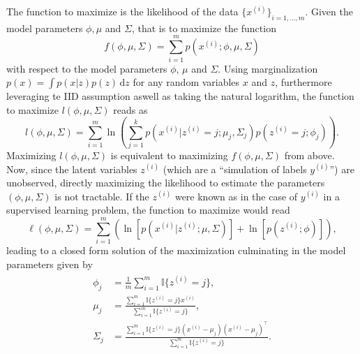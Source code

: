 \documentclass[a4paper,11pt]{article}
\numberwithin{equation}{section}
\begin{document}
{	The function to maximize is the likelihood of the data $\{x^{(i)}\}_{i=1,\dots,m}$. Given the model parameters $\phi, \mu$ and $\Sigma$, that is to maximize the function \begin{equation}
		f(\phi,\mu,\Sigma) = \sum_{i=1}^{m}p(x^{(i)};\phi,\mu,\Sigma)
	\end{equation} with respect to the model parameters $\phi$, $\mu$ and $\Sigma$. Using marginalization $p(x) = \int p(x|z)p(z)\,\mathrm{d}z$ for any random variables $x$ and $z$, furthermore leveraging te IID assumption aswell as taking the natural logarithm, the function to maximize $l(\phi,\mu,\Sigma)$ reads as \begin{equation}
	l(\phi,\mu,\Sigma) = \sum_{i=1}^m \ln \left( \sum_{j=1}^k p(x^{(i)} | z^{(i)} = j; \mu_j, \Sigma_j) p(z^{(i)} = j; \phi_j) \right).
	\end{equation} Maximizing $l(\phi,\mu,\Sigma)$ is equivalent to maximizing $f(\phi,\mu,\Sigma)$ from above. Now, since the latent variables $z^{(i)}$ (which are a ``simulation of labels $y^{(i)}$'') are unobserved, directly maximizing the likelihood to estimate the parameters $(\phi, \mu, \Sigma)$ is not tractable. If the $z^{(i)}$ were known as in the case of $y^{(i)}$ in a supervised learning problem, the function to maximize would read \begin{equation}
	\ell(\phi,\mu,\Sigma) = \sum_{i=1}^{m}\left(\ln\left[p(x^{(i)}|z^{(i)};\mu,\Sigma)\right] + \ln\left[p(z^{(i)};\phi)\right]\right),
	\end{equation} leading to a closed form solution of the maximization culminating in the model parameters given by \begin{align}
	\begin{aligned}
		\phi_j &= \frac{1}{m}\sum_{i=1}^{m}\mathbb{I}\{z^{(i)} = j\}, \\
		\mu_j &= \frac{\sum_{i=1}^{m}\mathbb{I}\{z^{(i)}=j\}x^{(i)}}{\sum_{i=1}^{m}\mathbb{I}\{z^{(i)} = j\}}, \\
		\Sigma_j &= \frac{\sum_{i=1}^{m}\mathbb{I}\{z^{(i)}=j\}(x^{(i)}-\mu_j)(x^{(i)}-\mu_j)^\top}{\sum_{i=1}^{m}\mathbb{I}\{z^{(i)}=j\}}.
	\end{aligned}
	\end{align}
	
}
\end{document}
